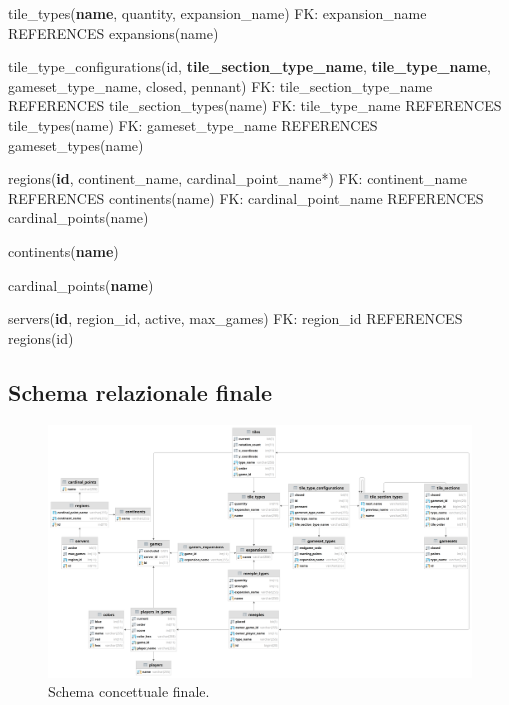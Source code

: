 tile\_types(\textbf{name}, quantity, expansion\_name)\newline
FK: expansion\_name REFERENCES expansions(name)\newline

tile\_type\_configurations(id, \textbf{tile\_section\_type\_name}, \textbf{tile\_type\_name}, gameset\_type\_name, closed, pennant)\newline
FK: tile\_section\_type\_name REFERENCES tile\_section\_types(name)\newline
FK: tile\_type\_name REFERENCES tile\_types(name)\newline
FK: gameset\_type\_name REFERENCES gameset\_types(name)\newline

regions(\textbf{id}, continent\_name, cardinal\_point\_name*)\newline
FK: continent\_name REFERENCES continents(name)\newline
FK: cardinal\_point\_name REFERENCES cardinal\_points(name)\newline

continents(\textbf{name})\newline

cardinal\_points(\textbf{name})\newline

servers(\textbf{id}, region\_id, active, max\_games)\newline
FK: region\_id REFERENCES regions(id)

\subsection{Schema relazionale finale}
\begin{figure}[ht]
    \centering\includegraphics[scale=0.06]{images/Progettazione/relazionale.png}
    \caption{Schema concettuale finale.}
\end{figure}

